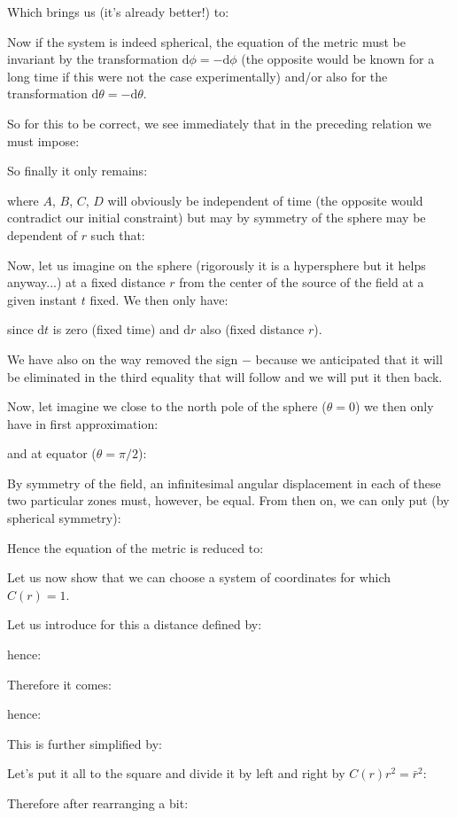 	Which brings us (it's already better!) to:
	
	Now if the system is indeed spherical, the equation of the metric must be invariant by the transformation $\mathrm{d}\phi=-\mathrm{d}\phi$ (the opposite would be known for a long time if this were not the case experimentally) and/or also for the transformation $\mathrm{d}\theta=-\mathrm{d}\theta$.

	So for this to be correct, we see immediately that in the preceding relation we must impose:
	
	So finally it only remains:
	
	where $A$, $B$, $C$, $D$ will obviously be independent of time (the opposite would contradict our initial constraint) but may by symmetry of the sphere may be dependent of $r$ such that:
	
	Now, let us imagine on the sphere (rigorously it is a hypersphere but it helps anyway...) at a fixed distance $r$ from the center of the source of the field at a given instant $t$ fixed. We then only have:
	
	since $\mathrm{d}t$ is zero (fixed time) and $\mathrm{d}r$ also (fixed distance $r$).

	We have also on the way removed the sign $-$ because we anticipated that it will be eliminated in the third equality that will follow and we will put it then back.

	Now, let imagine we close to the north pole of the sphere ($\theta=0$) we then only have in first approximation:
	
	and at equator ($\theta=\pi/2$):
	
	By symmetry of the field, an infinitesimal angular displacement in each of these two particular zones must, however, be equal. From then on, we can only put (by spherical symmetry):
	
	Hence the equation of the metric is reduced to:
	
	Let us now show that we can choose a system of coordinates for which $C(r)=1$.

	Let us introduce for this a distance defined by:
	
	hence:
	
	Therefore it comes:
	
	hence:
	
	This is further simplified by:
	
	Let's put it all to the square and divide it by left and right by $C(r)r^2=\bar{r}^2$:
	
	Therefore after rearranging a bit:
	
